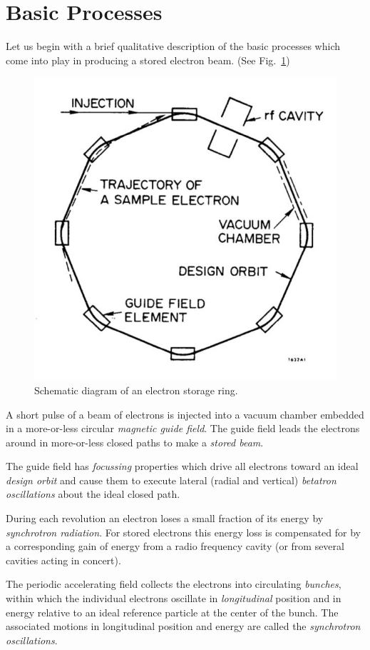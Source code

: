\section{Basic Processes}\label{sec:1.2}

Let us begin with a brief qualitative description of the basic processes which come into play in producing a stored electron beam. (See Fig.~\ref{fig:ring})

\begin{figure}[!htb]
	\centering
	\includegraphics[width=0.6\linewidth]{./Figuras/fig01.jpeg}
	\caption{Schematic diagram of an electron storage ring.}
	\label{fig:ring}
\end{figure}

A short pulse of a beam of electrons is injected into a vacuum chamber embedded in a more-or-less circular \emph{magnetic guide field}. The guide field leads the electrons around in more-or-less closed paths to make a \emph{stored beam}.

The guide field has \emph{focussing} properties which drive all electrons toward an ideal \emph{design orbit} and cause them to execute lateral (radial and vertical) \emph{betatron oscillations} about the ideal closed path.

During each revolution an electron loses a small fraction of its energy by \emph{synchrotron radiation}. For stored electrons this energy loss is compensated for by a corresponding gain of energy from a radio frequency cavity (or from several cavities acting in concert).

The periodic accelerating field collects the electrons into circulating \emph{bunches}, within which the individual electrons oscillate in \emph{longitudinal} position and in energy relative to an ideal reference particle at the center of the bunch. The associated motions in longitudinal position and energy are called the \emph{synchrotron oscillations}.

